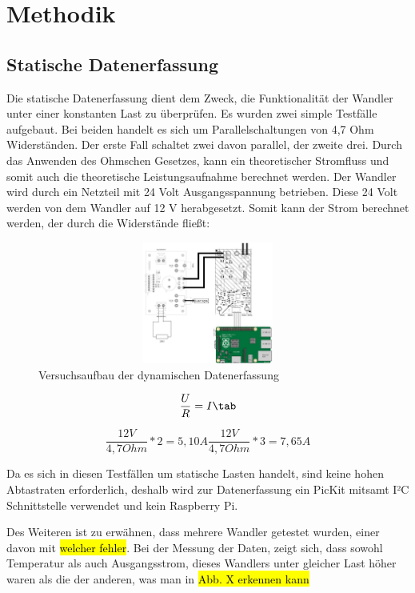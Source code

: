 \section{Methodik}
\subsection{Statische Datenerfassung}

Die statische Datenerfassung dient dem Zweck, die Funktionalität der Wandler unter einer konstanten Last zu überprüfen. Es wurden zwei simple Testfälle aufgebaut. Bei beiden handelt es sich um Parallelschaltungen von 4,7 Ohm Widerständen. Der erste Fall schaltet zwei davon parallel, der zweite drei. Durch das Anwenden des Ohmschen Gesetzes, kann ein theoretischer Stromfluss und somit auch die theoretische Leistungsaufnahme berechnet werden. Der Wandler wird durch ein Netzteil mit 24 Volt Ausgangsspannung betrieben. Diese 24 Volt werden von dem Wandler auf 12 V herabgesetzt. 
Somit kann der Strom berechnet werden, der durch die Widerstände fließt:



\begin{figure}
    \centering
    \includegraphics[height= 4cm, width = 12cm]{Pictures/Dyn_Schaltung.jpg}
    \caption{Versuchsaufbau der dynamischen Datenerfassung}
\end{figure}


\begin{equation}
\label{Ohmsches Gesetz}
\frac{U}{R} = I \tab
\end{equation}


\begin{equation}
\label{Ohmsches Gesetz}
\frac{12V}{4,7 Ohm}*2 = 5,10 A 
\frac{12V}{4,7 Ohm}*3 = 7,65 A
\end{equation}

Da es sich in diesen Testfällen um statische Lasten handelt, sind keine hohen Abtastraten erforderlich, deshalb wird zur Datenerfassung ein PicKit mitsamt I²C Schnittstelle verwendet und kein Raspberry Pi. 

Des Weiteren ist zu erwähnen, dass mehrere Wandler getestet wurden, einer davon mit \hl{welcher fehler}. Bei der Messung der Daten, zeigt sich, dass sowohl Temperatur als auch Ausgangsstrom, dieses Wandlers unter gleicher Last höher waren als die der anderen, was man in \hl{Abb. X erkennen kann} 


